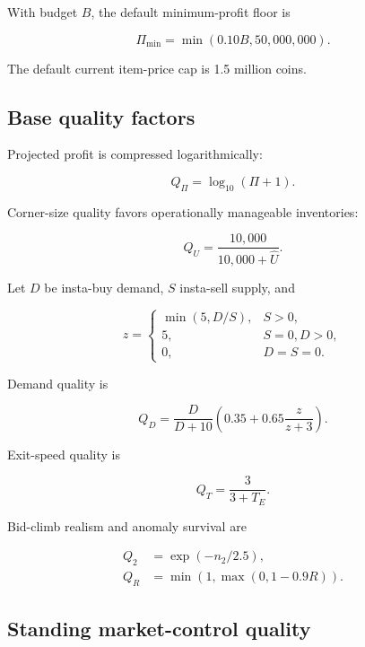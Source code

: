\documentclass[11pt,a4paper]{article}
\newcommand{\clip}[1]{\min\!\left(1,\max(0,#1)\right)}
\begin{document}
With budget $B$, the default minimum-profit floor is

\begin{equation}
\Pi_{\min}=\min(0.10B,50{,}000{,}000).
\end{equation}

The default current item-price cap is 1.5 million coins.

\subsection{Base quality factors}

Projected profit is compressed logarithmically:

\begin{equation}
Q_\Pi=\log_{10}(\Pi+1).
\end{equation}

Corner-size quality favors operationally manageable inventories:

\begin{equation}
Q_U=\frac{10{,}000}{10{,}000+\widehat U}.
\end{equation}

Let $D$ be insta-buy demand, $S$ insta-sell supply, and

\begin{equation}
z=\begin{cases}
\min(5,D/S),&S>0,\\
5,&S=0,D>0,\\
0,&D=S=0.
\end{cases}
\end{equation}

Demand quality is

\begin{equation}
Q_D=\frac{D}{D+10}\left(0.35+0.65\frac{z}{z+3}\right).
\end{equation}

Exit-speed quality is

\begin{equation}
Q_T=\frac{3}{3+T_E}.
\end{equation}

Bid-climb realism and anomaly survival are

\begin{align}
Q_2&=\exp(-n_2/2.5),\\
Q_R&=\clip{1-0.9R}.
\end{align}

\subsection{Standing market-control quality}
\end{document}
